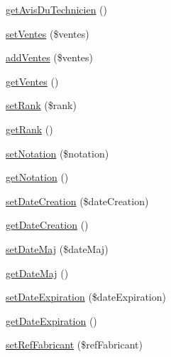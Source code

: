 \begin{DoxyCompactItemize}
\item 
\hyperlink{class_acme_group_1_1_labo_bundle_1_1_entity_1_1article_a3d6f66bb7f5ba673f1b027f9d0c23f1b}{get\+Avis\+Du\+Technicien} ()
\item 
\hyperlink{class_acme_group_1_1_labo_bundle_1_1_entity_1_1article_a1994034ad7cb8459648269bbbf86fc97}{set\+Ventes} (\$ventes)
\item 
\hyperlink{class_acme_group_1_1_labo_bundle_1_1_entity_1_1article_a3ca533942023a5bed1023e4e1da02fec}{add\+Ventes} (\$ventes)
\item 
\hyperlink{class_acme_group_1_1_labo_bundle_1_1_entity_1_1article_a733e1fcf58bd906e43c2a111e0b39710}{get\+Ventes} ()
\item 
\hyperlink{class_acme_group_1_1_labo_bundle_1_1_entity_1_1article_a87fe630c91e255ae3811b0648a93c9fd}{set\+Rank} (\$rank)
\item 
\hyperlink{class_acme_group_1_1_labo_bundle_1_1_entity_1_1article_a9b47ced93381b8e2a101a624eeb256f0}{get\+Rank} ()
\item 
\hyperlink{class_acme_group_1_1_labo_bundle_1_1_entity_1_1article_ace7f28b0420eb3359655ae3ec551b852}{set\+Notation} (\$notation)
\item 
\hyperlink{class_acme_group_1_1_labo_bundle_1_1_entity_1_1article_a30a92cbe8d932e041942a0895db13a3c}{get\+Notation} ()
\item 
\hyperlink{class_acme_group_1_1_labo_bundle_1_1_entity_1_1article_a132204309ccc20469a1aa14476df1c29}{set\+Date\+Creation} (\$date\+Creation)
\item 
\hyperlink{class_acme_group_1_1_labo_bundle_1_1_entity_1_1article_a959b6977393815709337e8db5b9ed72a}{get\+Date\+Creation} ()
\item 
\hyperlink{class_acme_group_1_1_labo_bundle_1_1_entity_1_1article_a26cac7a0de01d53bf71738a3f714159a}{set\+Date\+Maj} (\$date\+Maj)
\item 
\hyperlink{class_acme_group_1_1_labo_bundle_1_1_entity_1_1article_ac0bce8922d4695e3deb9e5309b9a9cc2}{get\+Date\+Maj} ()
\item 
\hyperlink{class_acme_group_1_1_labo_bundle_1_1_entity_1_1article_a2848cd15fa01d351be57e5fdf33534d8}{set\+Date\+Expiration} (\$date\+Expiration)
\item 
\hyperlink{class_acme_group_1_1_labo_bundle_1_1_entity_1_1article_a247065c09072bbb1d3ad7bc119d1160f}{get\+Date\+Expiration} ()
\item 
\hyperlink{class_acme_group_1_1_labo_bundle_1_1_entity_1_1article_abe1dcbc0051301ea7185597967c86190}{set\+Ref\+Fabricant} (\$ref\+Fabricant)

\end{DoxyCompactItemize}
